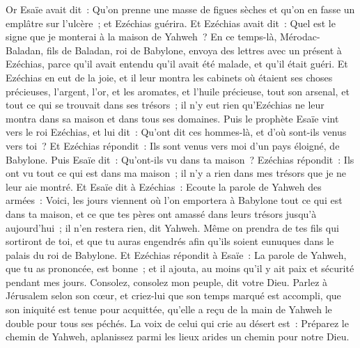 \begin{multicols}{2}
Or Esaïe avait dit~: Qu'on prenne une masse de figues sèches et qu'on en fasse un emplâtre sur l'ulcère~; et Ezéchias guérira.
Et Ezéchias avait dit~: Quel est le signe que je monterai à la maison de Yahweh~?
\VerseOne{}En ce temps-là, Mérodac-Baladan, fils de Baladan, roi de Babylone, envoya des lettres avec un présent à Ezéchias, parce qu'il avait entendu qu'il avait été malade, et qu'il était guéri.
Et Ezéchias en eut de la joie, et il leur montra les cabinets où étaient ses choses précieuses, l'argent, l'or, et les aromates, et l'huile précieuse, tout son arsenal, et tout ce qui se trouvait dans ses trésors~; il n'y eut rien qu'Ezéchias ne leur montra dans sa maison et dans tous ses domaines.
Puis le prophète Esaïe vint vers le roi Ezéchias, et lui dit~: Qu'ont dit ces hommes-là, et d'où sont-ils venus vers toi~? Et Ezéchias répondit~: Ils sont venus vers moi d'un pays éloigné, de Babylone.
Puis Esaïe dit~: Qu'ont-ils vu dans ta maison~? Ezéchias répondit~: Ils ont vu tout ce qui est dans ma maison~; il n'y a rien dans mes trésors que je ne leur aie montré.
Et Esaïe dit à Ezéchias~: Ecoute la parole de Yahweh des armées~:
Voici, les jours viennent où l'on emportera à Babylone tout ce qui est dans ta maison, et ce que tes pères ont amassé dans leurs trésors jusqu'à aujourd'hui~; il n'en restera rien, dit Yahweh.
Même on prendra de tes fils qui sortiront de toi, et que tu auras engendrés afin qu'ils soient eunuques dans le palais du roi de Babylone.
Et Ezéchias répondit à Esaïe~: La parole de Yahweh, que tu as prononcée, est bonne~; et il ajouta, au moins qu'il y ait paix et sécurité pendant mes jours.
\VerseOne{}Consolez, consolez mon peuple, dit votre Dieu.
Parlez à Jérusalem selon son cœur, et criez-lui que son temps marqué est accompli, que son iniquité est tenue pour acquittée, qu'elle a reçu de la main de Yahweh le double pour tous ses péchés.
La voix de celui qui crie au désert est~: Préparez le chemin de Yahweh, aplanissez parmi les lieux arides un chemin pour notre Dieu.

\end{multicols}
